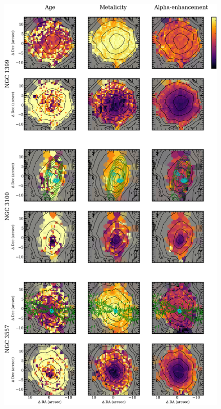	\begin{figure}
		\centering
		\includegraphics[height=0.94\textheight]{chapter4/vimos/pop3.png}
	\end{figure}
